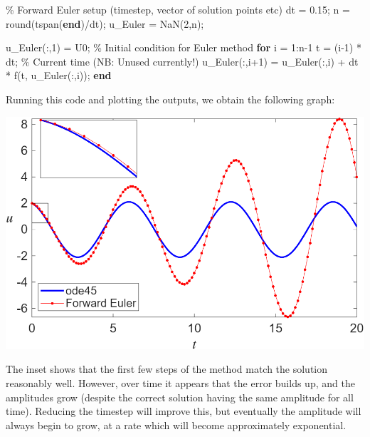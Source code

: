\documentclass[
  letterpaper,
  DIV=11,
  numbers=noendperiod]{scrreprt}
\newenvironment{Shaded}{\begin{snugshade}}{\end{snugshade}}
\newcommand{\CommentTok}[1]{\textcolor[rgb]{0.37,0.37,0.37}{#1}}
\newcommand{\FloatTok}[1]{\textcolor[rgb]{0.68,0.00,0.00}{#1}}
\newcommand{\KeywordTok}[1]{\textcolor[rgb]{0.00,0.23,0.31}{\textbf{#1}}}
\newcommand{\NormalTok}[1]{\textcolor[rgb]{0.00,0.23,0.31}{#1}}
\newcommand{\OperatorTok}[1]{\textcolor[rgb]{0.37,0.37,0.37}{#1}}
\newcommand{\VariableTok}[1]{\textcolor[rgb]{0.07,0.07,0.07}{#1}}
\begin{document}
\begin{Shaded}
\begin{Highlighting}[]
\CommentTok{\% Forward Euler setup (timestep, vector of solution points etc)}
\VariableTok{dt} \OperatorTok{=} \FloatTok{0.15}\OperatorTok{;} \VariableTok{n} \OperatorTok{=} \VariableTok{round}\NormalTok{(}\VariableTok{tspan}\NormalTok{(}\KeywordTok{end}\NormalTok{)}\OperatorTok{/}\VariableTok{dt}\NormalTok{)}\OperatorTok{;} \VariableTok{u\_Euler} \OperatorTok{=} \VariableTok{NaN}\NormalTok{(}\FloatTok{2}\OperatorTok{,}\VariableTok{n}\NormalTok{)}\OperatorTok{;}

\VariableTok{u\_Euler}\NormalTok{(}\OperatorTok{:,}\FloatTok{1}\NormalTok{) }\OperatorTok{=} \VariableTok{U0}\OperatorTok{;} \CommentTok{\% Initial condition for Euler method}
\KeywordTok{for} \VariableTok{i} \OperatorTok{=} \FloatTok{1}\OperatorTok{:}\VariableTok{n}\OperatorTok{{-}}\FloatTok{1}
    \VariableTok{t} \OperatorTok{=}\NormalTok{ (}\VariableTok{i}\OperatorTok{{-}}\FloatTok{1}\NormalTok{) }\OperatorTok{*} \VariableTok{dt}\OperatorTok{;} \CommentTok{\% Current time (NB: Unused currently!)}
    \VariableTok{u\_Euler}\NormalTok{(}\OperatorTok{:,}\VariableTok{i}\OperatorTok{+}\FloatTok{1}\NormalTok{) }\OperatorTok{=} \VariableTok{u\_Euler}\NormalTok{(}\OperatorTok{:,}\VariableTok{i}\NormalTok{) }\OperatorTok{+} \VariableTok{dt} \OperatorTok{*} \VariableTok{f}\NormalTok{(}\VariableTok{t}\OperatorTok{,} \VariableTok{u\_Euler}\NormalTok{(}\OperatorTok{:,}\VariableTok{i}\NormalTok{))}\OperatorTok{;}
\KeywordTok{end}
\end{Highlighting}
\end{Shaded}

Running this code and plotting the outputs, we obtain the following
graph:

\begin{center}
\includegraphics[width=0.7\linewidth,height=\textheight,keepaspectratio]{im/Forward_Euler_SHO.png}
\end{center}

The inset shows that the first few steps of the method match the
solution reasonably well. However, over time it appears that the error
builds up, and the amplitudes grow (despite the correct solution having
the same amplitude for all time). Reducing the timestep will improve
this, but eventually the amplitude will always begin to grow, at a rate
which will become approximately exponential.
\end{document}
